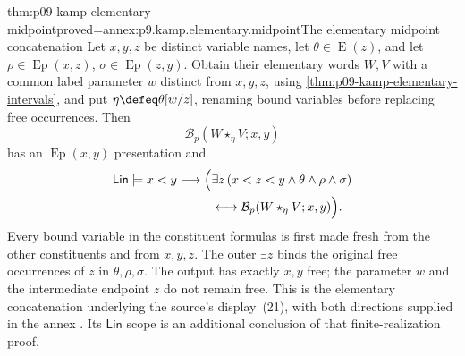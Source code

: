\begin{hblemma}{thm:p09-kamp-elementary-midpoint}{proved=annex:p9.kamp.elementary.midpoint}{The elementary midpoint concatenation}
Let \(x,y,z\) be distinct variable names, let
\(\theta\in\operatorname{E}(z)\), and let
\(\rho\in\operatorname{Ep}(x,z)\),
\(\sigma\in\operatorname{Ep}(z,y)\).
Obtain their elementary words \(W,V\) with a common label parameter
\(w\) distinct from \(x,y,z\), using
\cref{thm:p09-kamp-elementary-intervals}, and put
\(\eta\defeq\theta[w/z]\), renaming bound variables before replacing
free occurrences. Then
\[
                 \mathcal B_p(W\mathbin{\star_\eta}V;x,y)
\]
has an \(\operatorname{Ep}(x,y)\) presentation and
\[
\begin{split}
 \mathsf{Lin}\models x<y\longrightarrow
 \Bigl(&\exists z\,(x<z<y\land\theta\land\rho\land\sigma)\\
       &\longleftrightarrow
              \mathcal B_p(W\mathbin{\star_\eta}V;x,y)\Bigr).
\end{split}
\]
Every bound variable in the constituent formulas is first made fresh
from the other constituents and from \(x,y,z\). The outer
\(\exists z\) binds the original free occurrences of \(z\) in
\(\theta,\rho,\sigma\). The output has exactly \(x,y\) free; the
parameter \(w\) and the intermediate endpoint \(z\) do not remain free.
This is the elementary concatenation underlying the source's
display~(21), with both directions supplied in the annex
\cite[ch.~III, p.~79]{Kamp1968}.
Its \(\mathsf{Lin}\) scope is an additional conclusion of that
finite-realization proof.
\end{hblemma}

